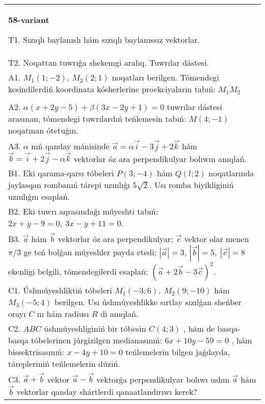 \documentclass{article}
\begin{document}
    
    \begin{tabular}{m{17cm}}
    \textbf{58-variant}
    \newline
    
    T1. 
    Sızıqlı baylanıslı hám sızıqlı baylanıssız vektorlar.
     \\
    T2. 
    Noqattan tuwrıǵa shekemgi aralıq. Tuwrılar dástesi.
     \\
    A1. $M_1(1; -2)$, $M_2(2; 1)$ noqatları berilgen. 
    Tómendegi kesindilerdiń koordinata kósherlerine proekciyaların tabıń: $\overline{M_1M_2}$ \\
     \\
    A2. 
    $\alpha(x+2y-5)+\beta(3x-2y+1)=0$ tuwrılar
    dástesi arasınan, tómendegi tuwrılardıń teńlemesin tabıń:
    $M(4;-1)$ noqatınan ótetuǵın.
     \\
    A3. 
    $\alpha$
    nıń qanday mánisinde
    $\overrightarrow{a} = \alpha\overrightarrow{i} - 3\overrightarrow{j} + 2\overrightarrow{k}$
    hám
    $\overrightarrow{b} = \overrightarrow{i} + 2\overrightarrow{j} - \alpha\overrightarrow{k}$
    vektorlar óz ara perpendikulyar bolıwın anıqlań. 
     \\
    B1. 
    Eki qarama-qarsı tóbeleri $P(3; -4)$ hám $Q(l;2)$ noqatlarında jaylasqan rombanıń tárepi uzınlıǵı \(5\sqrt{2}\). Usı romba biyikliginiń uzınlıǵın esaplań.
     \\
    B2. 
    Eki tuwrı aqrasındaǵı múyeshti tabıń: $2x+y-9=0,\ 3x-y+11=0$.
     \\
    B3. 
    $\vec{a}$ hám $\vec{b}$ vektorlar óz ara perpendikulyar; $\vec{c}$ vektor olar menen $\pi/3$ ge teń bolǵan múyeshler payda etedi; $|\vec{a}| = 3$, $|\vec{b}| = 5,\ |\vec{c}| = 8$ ekenligi belgili, tómendegilerdi esaplań: 
    $(\vec{a} + 2\vec{b} - 3\vec{c}) ^{2}$.
     \\
    C1. 
    Úshmúyeshliktiń tóbeleri \(M_{1}( - 3;6),\ M_{2}(9; - 10)\) 
    hám \(M_{3}( - 5;4)\) berilgen. Usı úshmúyeshlikke sırtlay sızılǵan
    sheńber orayı $C$ nı hám radiusı $R$ di anıqlań.
     \\
    C2. 
    $ABC$ úshmúyeshliginiń bir tóbesin \(C(4;3)\) , hám de
    basqa-basqa tóbelerinen júrgizilgen medianasınıń:
    \(6x + 10y - 59 = 0\) , hám bissektrisasınıń: \(x - 4y + 10 = 0\) 
    teńlemelerin bilgen jaǵdayda, tárepleriniń teńlemelerin dúziń.
     \\
    C3. 
    \(\vec{a} + \vec{b}\) vektor \(\vec{a} - \vec{b}\) vektorǵa perpendikulyar bolıwı ushın \(\vec{a}\) hám \(\vec{b}\) vektorlar qanday shártlerdi qanaatlandırıwı kerek?
     \\
    
    \end{tabular}
    \vspace{1cm}
    
\end{document}
